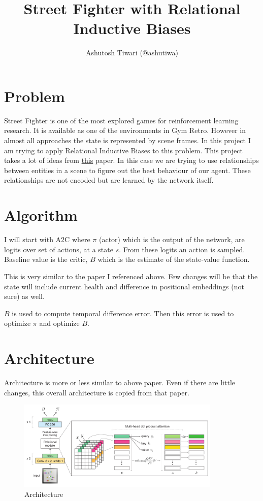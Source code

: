 \documentclass{article}
\title{Street Fighter with Relational Inductive Biases}
\author{Ashutosh Tiwari (@ashutiwa)}
\begin{document}
\maketitle

\section{Problem}

Street Fighter is one of the most explored games for reinforcement learning research. It is available as one of the environments in Gym Retro. However in almost all approaches the state is represented by scene frames. In this project I am trying to apply Relational Inductive Biases to this problem. 
This project takes a lot of ideas from \href{https://openreview.net/pdf?id=HkxaFoC9KQ}{this} paper. In this case we are trying to use relationships between entities in a scene to figure out the best behaviour of our agent. These relationships are not encoded but are learned by the network itself.

\section{Algorithm}

I will start with A2C where $\pi$ (actor) which is the output of the network, are logits over set of actions, at a state $s$. From these logits an action is sampled. Baseline value is the critic, $B$ which is the estimate of the state-value function.

This is very similar to the paper I referenced above. Few changes will be that the state will include current health and difference in positional embeddings (not sure) as well.

$B$ is used to compute temporal difference error. Then this error is used to optimize $\pi$ and optimize $B$.

\section{Architecture}
Architecture is more or less similar to above paper. Even if there are little changes, this overall architecture is copied from that paper.

\begin{figure}[H]
\centering
\includegraphics[width=3.8in]{Screenshot from 2022-03-30 22-16-29.png}
\caption{Architecture}
\end{figure}
\end{document}
